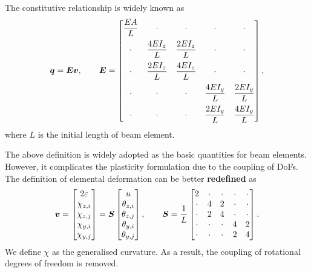 The constitutive relationship is widely known as
\begin{gather*}
\bm{q}=\bm{E}\bm{v},\qquad\bm{E}=\begin{bmatrix}
\dfrac{EA}{L}&\cdot&\cdot&\cdot&\cdot\\[3mm]
\cdot&\dfrac{4EI_z}{L}&\dfrac{2EI_z}{L}&\cdot&\cdot\\[3mm]
\cdot&\dfrac{2EI_z}{L}&\dfrac{4EI_z}{L}&\cdot&\cdot\\[3mm]
\cdot&\cdot&\cdot&\dfrac{4EI_y}{L}&\dfrac{2EI_y}{L}\\[3mm]
\cdot&\cdot&\cdot&\dfrac{2EI_y}{L}&\dfrac{4EI_y}{L}
\end{bmatrix},
\end{gather*}
where $L$ is the initial length of beam element.

The above definition is widely adopted as the basic quantities for beam elements. However, it complicates the plasticity formulation due to the coupling of DoFs. The definition of elemental deformation can be better \textbf{redefined} as
\begin{gather}
\bm{v}=\begin{bmatrix}
2\varepsilon\\\chi_{z,i}\\\chi_{z,j}\\\chi_{y,i}\\\chi_{y,j}
\end{bmatrix}=\bm{S}\begin{bmatrix}
u\\\theta_{z,i}\\\theta_{z,j}\\\theta_{y,i}\\\theta_{y,j}
\end{bmatrix},\qquad\bm{S}=\dfrac{1}{L}\begin{bmatrix}
2&\cdot&\cdot&\cdot&\cdot\\
\cdot&4&2&\cdot&\cdot\\
\cdot&2&4&\cdot&\cdot\\
\cdot&\cdot&\cdot&4&2\\
\cdot&\cdot&\cdot&2&4
\end{bmatrix}.
\end{gather}
We define $\chi$ as the generalised curvature. As a result, the coupling of rotational degrees of freedom is removed.

